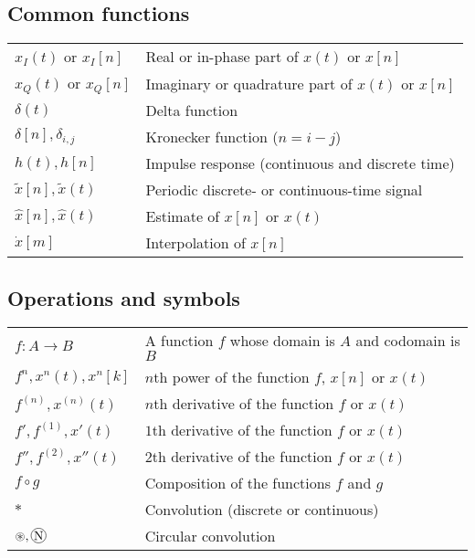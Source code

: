 \documentclass{article}
\newcommand*\circconv[1]{%
\tikz[baseline=(C.base)]\node[draw,circle,inner sep=0.5pt](C) {#1};\!
}
\begin{document}
\subsection{Common functions}
\begin{xltabular}{\textwidth}{XX}
    \(x_I(t)\) or \(x_I[n]\) & Real or in-phase part of \(x(t)\) or \(x[n]\)\\
    \(x_Q(t)\) or \(x_Q[n]\) & Imaginary or quadrature part of \(x(t)\) or \(x[n]\)\\
    \(\delta(t)\) & Delta function\\
    \(\delta[n], \delta_{i,j}\) & Kronecker function (\(n = i-j\))\\
    \(h(t), h[n]\) & Impulse response (continuous and discrete time)\\
    \(\tilde{x}[n], \tilde{x}(t)\) & Periodic discrete- or continuous-time signal\\
    \(\hat{x}[n], \hat{x}(t)\) & Estimate of \(x[n]\) or \(x(t)\)\\
    \(\dot{x}[m]\) & Interpolation of \(x[n]\)\\
\end{xltabular}
\subsection{Operations and symbols}
\begin{xltabular}{\textwidth}{XX}
    \(f: A \rightarrow B\)& A function \(f\) whose domain is \(A\) and codomain is \(B\)\\
    \(f^{n}, x^{n}(t), x^{n}[k]\) & \(n\)th power of the function \(f\), \(x[n]\) or \(x(t)\)\\
    \(f^{\left( n \right)},  x^{(n)}(t)\) & \(n\)th derivative of the function \(f\) or \(x(t)\)\\
    \(f', f^{\left( 1 \right)}, x'(t)\) & \(1\)th derivative of the function \(f\) or \(x(t)\)\\
    \(f'', f^{\left( 2 \right)}, x''(t)\) & \(2\)th derivative of the function \(f\) or \(x(t)\)\\
    \(f \circ g\) & Composition of the functions \(f\) and \(g\)\\
    \(*\) & Convolution (discrete or continuous)\\
    \(\circledast, \circconv{N}\) & Circular convolution\\
\end{xltabular}
\end{document}
